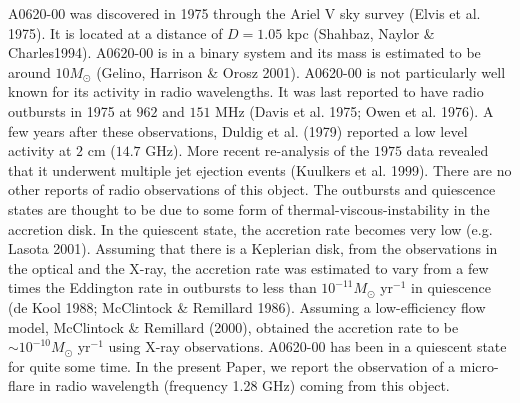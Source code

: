 \documentclass[referee]{cjaa}           %
\begin{document}
A0620-00 was discovered in 1975 through
the Ariel V sky survey (Elvis et al. 1975). It is located at a 
distance of $D=1.05$ kpc (Shahbaz, Naylor \& Charles1994).
A0620-00 is in a binary system and its mass is estimated to be 
around $10M_\odot$ (Gelino, Harrison \& Orosz 2001). A0620-00 is not particularly well
known for its activity in radio wavelengths.  It was last reported to have
radio outbursts in 1975 at $962$ and $151$ MHz (Davis et al. 1975; Owen et al. 1976).
A few years after these observations, Duldig et al. (1979) reported a low level activity at
$2$ cm ($14.7$ GHz). More recent re-analysis of the $1975$ data revealed that it
underwent multiple jet ejection events (Kuulkers et al. 1999). There are 
no other reports of radio observations of this object. The outbursts and quiescence 
states are thought to be due to some form of thermal-viscous-instability in the accretion 
disk.  In the quiescent state, the accretion rate becomes very low (e.g. Lasota 2001).
Assuming that there is a Keplerian disk, from the observations in the optical and the 
X-ray, the accretion rate was estimated to vary from a few times the Eddington rate in 
outbursts to less than $ 10^{-11} M_\odot$ yr$^{-1}$ in quiescence 
(de Kool 1988; McClintock \& Remillard 1986).
Assuming a low-efficiency flow model, McClintock \& Remillard (2000), obtained 
the accretion rate to be $\sim 10^{-10} M_\odot$ yr$^{-1}$ using X-ray observations.  
A0620-00 has been in a quiescent state for quite some time. 
In the present Paper, we report the observation of a micro-flare in radio wavelength 
(frequency 1.28 GHz) coming from this object. 

\end{document}
